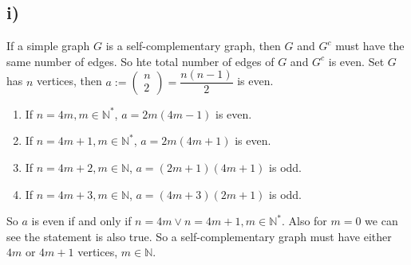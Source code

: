 \documentclass[a4paper,12pt,titlepage]{article}
\begin{document}
\subsection*{i)}
If a simple graph $G$ is a self-complementary graph, then $G$ and $G^c$ must have the same number of edges. So hte total number of edges of $G$ and $G^c$ is even. Set $G$ has $n$ vertices, then $a:=\begin{pmatrix}
n\\
2
\end{pmatrix}=\dfrac{n(n-1)}{2}
$
is even.
\begin{enumerate}
\item If $n=4m,m\in\mathbb{N}^*$, $a=2m(4m-1)$ is even.
\item If $n=4m+1,m\in\mathbb{N}^*$, $a=2m(4m+1)$ is even.
\item If $n=4m+2,m\in\mathbb{N}$, $a=(2m+1)(4m+1)$ is odd.
\item If $n=4m+3,m\in\mathbb{N}$, $a=(4m+3)(2m+1)$ is odd.
\end{enumerate}
So $a$ is even if and only if $n=4m\vee n=4m+1,m\in\mathbb{N}^*$. Also for $m=0$ we can see the statement is also true. So a self-complementary graph must have either $4m$ or $4m + 1$ vertices, $m\in\mathbb{N}$.
\end{document}
